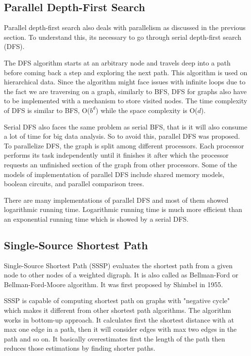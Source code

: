 \documentclass[journal,twoside,web]{ieeecolor}
\begin{document}
\subsection{Parallel Depth-First Search}
Parallel depth-first search also deals with parallelism as discussed in the previous section. To understand this, its necessary to go through serial depth-first search (DFS).

The DFS algorithm starts at an arbitrary node and travels deep into a path before coming back a step and exploring the next path. This algorithm is used on hierarchical data. Since the algorithm might face issues with infinite loops due to the fact we are traversing on a graph, similarly to BFS, DFS for graphs also have to be implemented with a mechanism to store visited nodes. The time complexity of DFS is similar to BFS, O($b^d$) while the space complexity is O($d$).

Serial DFS also faces the same problem as serial BFS, that is it will also consume a lot of time for big data analysis. So to avoid this, parallel DFS was proposed. To parallelize DFS, the graph is split among different processors. Each processor performs its task independently until it finishes it after which the processor requests an unfinished section of the graph from other processors. Some of the models of implementation of parallel DFS include shared memory models, boolean circuits, and parallel comparison trees\cite{38}.  

There are many implementations of parallel DFS and most of them showed logarithmic running time\cite{38}. Logarithmic running time is much more efficient than an exponential running time which is showed by a serial DFS.

\subsection{Single-Source Shortest Path}
Single-Source Shortest Path (SSSP) evaluates the shortest path from a given node to other nodes of a weighted digraph. It is also called as Bellman-Ford or Bellman-Ford-Moore algorithm\cite{41}. It was first proposed by Shimbel\cite{42} in 1955.

SSSP is capable of computing shortest path on graphs with "negative cycle" which makes it different from other shortest path algorithms. The algorithm works in bottom-up approach. It calculates first the shortest distance with at max one edge in a path, then it will consider edges with max two edges in the path and so on. It basically overestimates first the length of the path then reduces those estimations by finding shorter paths. 
\end{document}
